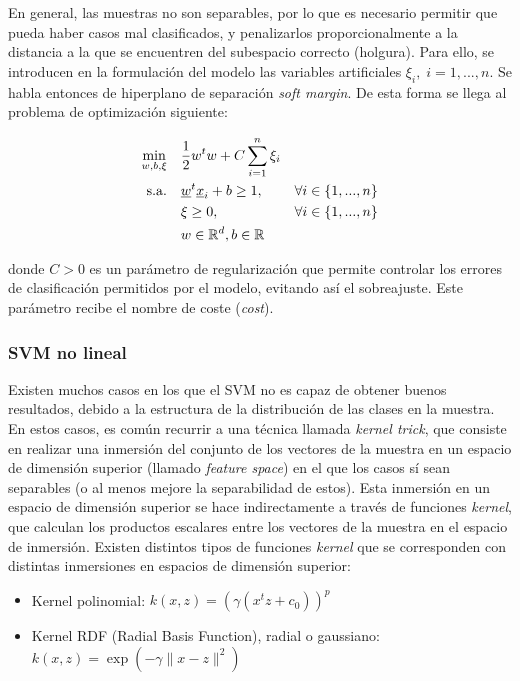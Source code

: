 \documentclass[12pt,a4paper,]{book}
\providecommand{\tightlist}{%
  \setlength{\itemsep}{0pt}\setlength{\parskip}{0pt}}
\numberwithin{dummy}{section}
\theoremstyle{ocrenumbox}
\theoremstyle{blacknumex}
\theoremstyle{blacknumbox}
\theoremstyle{ocrenum}
\theoremstyle{ocrenum}
\begin{document}
En general, las muestras no son separables, por lo que es necesario
permitir que pueda haber casos mal clasificados, y penalizarlos
proporcionalmente a la distancia a la que se encuentren del subespacio
correcto (holgura). Para ello, se introducen en la formulación del
modelo las variables artificiales \(\xi_i,\; i=1,...,n\). Se habla
entonces de hiperplano de separación \emph{soft margin}. De esta forma
se llega al problema de optimización siguiente:

\begin{equation}
\begin{aligned}
\min_{w,b,\xi} \quad & \frac{1}{2}w^{t}w+C\sum_{i=1}^{n}{\xi_{i}}\\
\textrm{s.a.} \quad & \underline w^t \underline x_i+b \ge 1, \quad & \forall i\in \{1,...,n\}\\
  &\xi\geq0,   \quad & \forall i\in \{1,...,n\} \\
  & w \in \mathbb{R}^d, \space b \in \mathbb{R} \\
\end{aligned}
\end{equation}

donde \(C>0\) es un parámetro de regularización que permite controlar
los errores de clasificación permitidos por el modelo, evitando así el
sobreajuste. Este parámetro recibe el nombre de coste (\emph{cost}).

\hypertarget{svm-no-lineal}{%
\subsubsection{SVM no lineal}\label{svm-no-lineal}}

Existen muchos casos en los que el SVM no es capaz de obtener buenos
resultados, debido a la estructura de la distribución de las clases en
la muestra. En estos casos, es común recurrir a una técnica llamada
\emph{kernel trick}, que consiste en realizar una inmersión del conjunto
de los vectores de la muestra en un espacio de dimensión superior
(llamado \emph{feature space}) en el que los casos sí sean separables (o
al menos mejore la separabilidad de estos). Esta inmersión en un espacio
de dimensión superior se hace indirectamente a través de funciones
\emph{kernel}, que calculan los productos escalares entre los vectores
de la muestra en el espacio de inmersión. Existen distintos tipos de
funciones \emph{kernel} que se corresponden con distintas inmersiones en
espacios de dimensión superior:

\begin{itemize}
\tightlist
\item
  Kernel polinomial: \(k(x,z) = \left( \gamma(x^tz + c_0) \right)^p\)
\item
  Kernel RDF (Radial Basis Function), radial o gaussiano:
  \(k(x,z) = \exp(-\gamma \| x-z\|^2)\)
\end{itemize}
\end{document}

